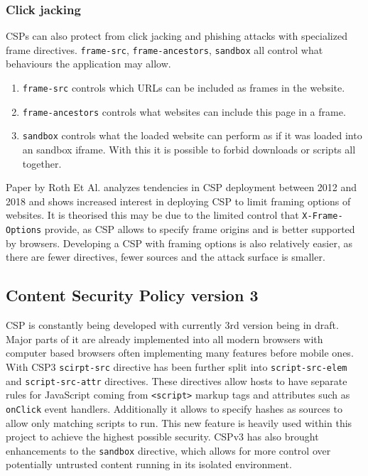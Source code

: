 \subsubsection{Click jacking}
CSPs can also protect from click jacking and phishing attacks with specialized frame directives. 
\texttt{frame-src}, \texttt{frame-ancestors}, \texttt{sandbox} all control what behaviours the application may allow.
\begin{enumerate}
	\item \texttt{frame-src} controls which URLs can be included as frames in the website.
	\item \texttt{frame-ancestors} controls what websites can include this page in a frame.
	\item \texttt{sandbox} controls what the loaded website can perform as if it was loaded into an sandbox iframe. With this it is possible to forbid downloads or scripts all together.
\end{enumerate}
Paper by Roth Et Al. analyzes tendencies in CSP deployment between 2012 and 2018 and shows increased interest in deploying CSP to limit framing options of websites. \cite{osti_10173479}
It is theorised this may be due to the limited control that \texttt{X-Frame-Options} provide, as CSP allows to specify frame origins and is better supported by browsers.
Developing a CSP with framing options is also relatively easier, as there are fewer directives, fewer sources and the attack surface is smaller.

\subsection{Content Security Policy version 3}
CSP is constantly being developed with currently 3rd version being in draft.
Major parts of it are already implemented into all modern browsers with computer based browsers often implementing many features before mobile ones.
With CSP3 \texttt{scirpt-src} directive has been further split into \texttt{script-src-elem} and \texttt{script-src-attr} directives.
These directives allow hosts to have separate rules for JavaScript coming from \texttt{<script>} markup tags and attributes such as \texttt{onClick} event handlers.
Additionally it allows to specify hashes as sources to allow only matching scripts to run.
This new feature is heavily used within this project to achieve the highest possible security.
CSPv3 has also brought enhancements to the \texttt{sandbox} directive, which allows for more control over potentially untrusted content running in its isolated environment.

